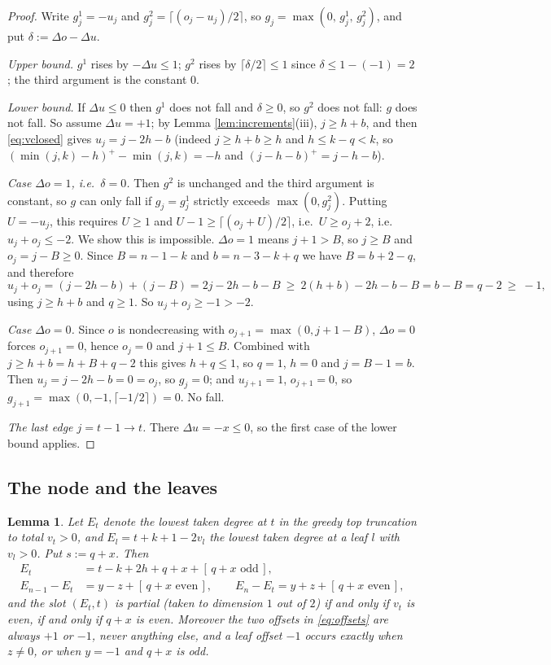 \documentclass[reqno]{amsart}
\theoremstyle{plain}
\newtheorem{lemma}[theorem]{Lemma}
\theoremstyle{definition}
\begin{document}
\begin{proof}
Write $g^{1}_j=-u_j$ and $g^{2}_j=\lceil(o_j-u_j)/2\rceil$, so
$g_j=\max(0,\,g^{1}_j,\,g^{2}_j)$, and put
$\delta:=\Delta o-\Delta u$.

\emph{Upper bound.}  $g^{1}$ rises by $-\Delta u\le1$; $g^{2}$ rises
by $\lceil\delta/2\rceil\le1$ since $\delta\le 1-(-1)=2$; the third argument is
the constant $0$.

\emph{Lower bound.}  If $\Delta u\le0$ then $g^{1}$ does not fall and
$\delta\ge0$, so $g^{2}$ does not fall: $g$ does not fall.  So assume
$\Delta u=+1$; by Lemma \ref{lem:increments}(iii), $j\ge h+b$, and then
\eqref{eq:vclosed} gives $u_j=j-2h-b$ (indeed $j\ge h+b\ge h$ and $h\le k-q<k$,
so $(\min(j,k)-h)^+-\min(j,k)=-h$ and $(j-h-b)^+=j-h-b$).

\emph{Case $\Delta o=1$, i.e.\ $\delta=0$.}  Then $g^{2}$ is unchanged and the
third argument is constant, so $g$ can only fall if $g_j=g^{1}_j$ strictly
exceeds $\max(0,g^{2}_j)$.  Putting $U=-u_j$, this requires $U\ge1$ and
$U-1\ge\lceil(o_j+U)/2\rceil$, i.e.\ $U\ge o_j+2$, i.e.\ $u_j+o_j\le-2$.  We
show this is impossible.  $\Delta o=1$ means $j+1>B$, so $j\ge B$ and
$o_j=j-B\ge0$.  Since $B=n-1-k$ and $b=n-3-k+q$ we have $B=b+2-q$, and
therefore
\[
   u_j+o_j=(j-2h-b)+(j-B)=2j-2h-b-B\ \ge\ 2(h+b)-2h-b-B=b-B=q-2\ \ge\ -1,
\]
using $j\ge h+b$ and $q\ge1$.  So $u_j+o_j\ge-1>-2$.

\emph{Case $\Delta o=0$.}  Since $o$ is nondecreasing with
$o_{j+1}=\max(0,j+1-B)$, $\Delta o=0$ forces $o_{j+1}=0$, hence $o_j=0$ and
$j+1\le B$.  Combined with $j\ge h+b=h+B+q-2$ this gives $h+q\le1$, so
$q=1$, $h=0$ and $j=B-1=b$.  Then $u_j=j-2h-b=0=o_j$, so $g_j=0$; and
$u_{j+1}=1$, $o_{j+1}=0$, so
$g_{j+1}=\max(0,-1,\lceil-1/2\rceil)=0$.  No fall.

\emph{The last edge $j=t-1\to t$.}  There $\Delta u=-x\le0$, so the first case
of the lower bound applies.
\end{proof}

\subsection{The node and the leaves}

\begin{lemma}\label{lem:node}
Let $E_t$ denote the lowest \emph{taken} degree at $t$ in the greedy top
truncation to total $v_t>0$, and $E_l=t+k+1-2v_l$ the lowest taken degree at a
leaf $l$ with $v_l>0$.  Put $s:=q+x$.  Then
\begin{align}
   E_t&=t-k+2h+q+x+[\,q+x \text{ odd}\,],\label{eq:Dt}\\
   E_{n-1}-E_t&=y-z+[\,q+x \text{ even}\,],
   \qquad
   E_{n}-E_t=y+z+[\,q+x \text{ even}\,],\label{eq:offsets}
\end{align}
and the slot $(E_t,t)$ is \emph{partial} \textup{(}taken to dimension $1$ out
of $2$\textup{)} if and only if $v_t$ is even, if and only if $q+x$ is even.
Moreover the two offsets in \eqref{eq:offsets} are always $+1$ or $-1$, never
anything else, and a leaf offset $-1$ occurs exactly when $z\ne0$, or when
$y=-1$ and $q+x$ is odd.
\end{lemma}
\end{document}
